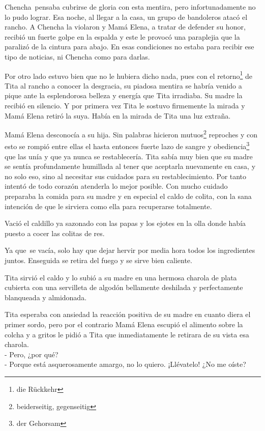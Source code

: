 Chencha~pensaba cubrirse de gloria con esta mentira, pero
infortunadamente no lo pudo lograr. Esa noche, al llegar a la casa, un
grupo de bandoleros atacó el rancho. A Chencha la violaron y Mamá Elena,
a tratar de defender su honor, recibió un fuerte golpe en la espalda y
este le provocó una paraplejia que la paralizó de la cintura para abajo.
En esas condiciones no estaba para recibir ese tipo de noticias, ni
Chencha como para darlas.

Por otro lado estuvo bien que no le hubiera dicho nada, pues con el retorno\footnote{die Rückkehr} de Tita al rancho a conocer
la desgracia, su piadosa mentira se
habría venido a pique ante la esplendorosa belleza y energía que Tita
irradiaba. Su madre la recibió en silencio. Y por primera vez Tita le
sostuvo firmemente la mirada y Mamá Elena retiró la suya. Había en la
mirada de Tita una luz extraña.

Mamá Elena desconocía a su hija. Sin palabras hicieron mutuos\footnote{beiderseitig, gegenseitig}
reproches y con esto se rompió entre ellas el hasta entonces fuerte
lazo de sangre y obediencia\footnote{der Gehorsam} que las
unía y que ya nunca se restablecería. Tita sabía muy bien que su madre
se sentía profundamente humillada al tener que aceptarla nuevamente en
casa, y no solo eso, sino al necesitar sus cuidados para su restablecimiento.
Por tanto intentó de todo corazón atenderla lo mejor posible. Con mucho
cuidado preparaba la comida para su madre y en especial el caldo de colita,
con la sana intención de que le sirviera como ella para recuperarse
totalmente.

Vació el caldillo ya sazonado con las papas y los ejotes en la olla
donde había puesto a cocer las colitas de res.

Ya que~se vacía, solo hay que dejar hervir por media hora todos
los ingredientes juntos. Enseguida se retira del fuego y se sirve bien
caliente.

Tita sirvió el caldo y lo subió a su madre en una hermosa charola de
plata cubierta con una servilleta de algodón bellamente deshilada y
perfectamente blanqueada y almidonada.

Tita esperaba con ansiedad la reacción positiva de su madre en cuanto
diera el primer sordo, pero por el contrario Mamá Elena escupió el
alimento sobre la colcha y a gritos le pidió a Tita que inmediatamente
le retirara de su vista esa charola.
\\- Pero, ¿por qué? %
\\- Porque está asquerosamente amargo, no lo quiero. ¡Llévatelo! ¿No me %
oíste?\\


